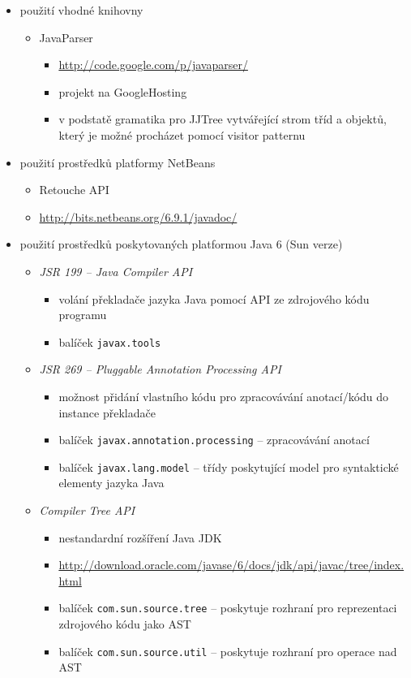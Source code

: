 \begin{itemize}
\begin{itemize}
\begin{itemize}
    \end{itemize}
  \end{itemize}
\item použití vhodné knihovny
  \begin{itemize}
  \item JavaParser
    \begin{itemize}
    \item \href{http://code.google.com/p/javaparser/}{http://code.google.com/p/javaparser/}
    \item projekt na GoogleHosting
    \item v podstatě gramatika pro JJTree vytvářející strom tříd a objektů, který je možné procházet pomocí visitor patternu
    \end{itemize}
  \end{itemize}
\item použití prostředků platformy NetBeans
  \begin{itemize}
  \item Retouche API
  \item \href{http://bits.netbeans.org/6.9.1/javadoc/}{http://bits.netbeans.org/6.9.1/javadoc/}
  \end{itemize}
\item použití prostředků poskytovaných platformou Java 6 (Sun verze) \cite{source_code_analysis_corejavatechtips}
  \begin{itemize}
  \item \emph{JSR 199 -- Java Compiler API}
    \begin{itemize}
    \item volání překladače jazyka Java pomocí API ze zdrojového kódu programu
    \item balíček \verb+javax.tools+
    \end{itemize}
  \item \emph{JSR 269 -- Pluggable Annotation Processing API}
    \begin{itemize}
    \item možnost přidání vlastního kódu pro zpracovávání anotací/kódu do instance překladače
    \item balíček \verb+javax.annotation.processing+ -- zpracovávání anotací
    \item balíček \verb+javax.lang.model+ -- třídy poskytující model pro syntaktické elementy jazyka Java
    \end{itemize}
  \item \emph{Compiler Tree API}
    \begin{itemize}
    \item nestandardní rozšíření Java JDK
    \item \href{http://download.oracle.com/javase/6/docs/jdk/api/javac/tree/index.html}{http://download.oracle.com/javase/6/docs/jdk/api/javac/tree/index.html}
    \item balíček \verb+com.sun.source.tree+ -- poskytuje rozhraní pro reprezentaci zdrojového kódu jako AST
    \item balíček \verb+com.sun.source.util+ -- poskytuje rozhraní pro operace nad AST
    \end{itemize}
  \end{itemize}
\end{itemize}
